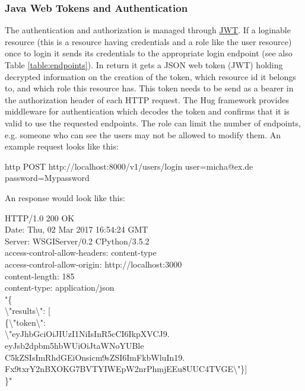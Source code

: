 \subsubsection{Java Web Tokens and Authentication}\label{subsubsection:auth}
The authentication and authorization is managed through \href{https://github.com/jpadilla/pyjwt}{JWT}. If a loginable resource (this is a resource having credentials and a role like the  user resource) once to login it sends its credentials to the appropriate login endpoint (see also Table \ref{table:endpoints}). In return it gets a JSON web token (JWT) holding decrypted information on the creation of the token, which resource id it belongs to, and which role this resource has. This token needs to be send as a bearer in the authorization header of each HTTP request. The Hug framework provides middleware for authentication which decodes the token and confirms that it is valid to use the requested endpoints. The role can limit the number of endpoints, e.g. someone who can see the users may not be allowed to modify them. An example request looks like this:
\begin{tcolorbox}
	http POST http://localhost:8000/v1/users/login user=micha@ex.de password=Mypassword
\end{tcolorbox}
An response would look like this:
\begin{tcolorbox}
HTTP/1.0 200 OK\\
Date: Thu, 02 Mar 2017 16:54:24 GMT\\
Server: WSGIServer/0.2 CPython/3.5.2\\
access-control-allow-headers: content-type\\
access-control-allow-origin: http://localhost:3000\\
content-length: 185\\
content-type: application/json\\

"\{\\
\textbackslash"results\textbackslash": [\\
\{\textbackslash"token\textbackslash": \\
\textbackslash"eyJhbGciOiJIUzI1NiIsInR5cCI6IkpXVCJ9.\\
eyJsb2dpbm5hbWUiOiJtaWNoYUBle\\
C5kZSIsImRhdGEiOnsicm9sZSI6ImFkbWluIn19.\\
Fx9txrY2nBXOKG7BVTYIWEpW2nrPhmjEEu8UUC4TVGE\textbackslash"\}]\\
\}"
\end{tcolorbox}

